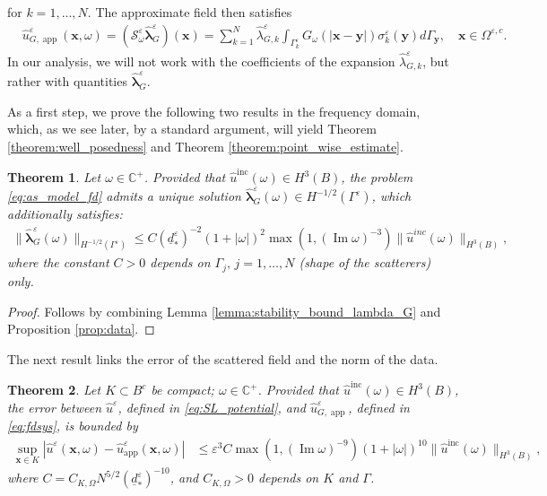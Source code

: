 \documentclass[]{article}
\newtheorem{theorem}{Theorem}
\numberwithin{equation}{section}
\numberwithin{theorem}{section}
\numberwithin{lemma}{section}
\numberwithin{corollary}{section}
\numberwithin{proposition}{section}
\numberwithin{definition}{section}
\newcommand{\bx}{\boldsymbol{x}}
\newcommand{\blambda}{\boldsymbol{\lambda}}
\newcommand{\re}{\varepsilon}
\renewcommand{\vec}{\boldsymbol}
\renewcommand{\Im}{\operatorname{Im}}
\newcommand{\inc}{\operatorname{inc}}
\begin{document}
	for $k = 1, \dots, N$. The approximate field then satisfies 
	\begin{align}
		\label{eq:fdsys}
		&\hat{u}^{\re}_{G,\operatorname{app}}(\boldsymbol{x},\omega) = (\mathcal{S}^{\re}_{\omega} \hat{{\blambda}}^{\re}_G)(\boldsymbol{x}) = \sum_{k=1}^{N} \hat{\lambda}^{\re}_{G,k} \int_{\Gamma^{\re}_k}  G_{\omega}(|\boldsymbol{x} - \boldsymbol{y}|) \sigma_k^{\re}(\vec{y}) d\Gamma_{\boldsymbol{y}} , \quad \boldsymbol{x} \in \Omega^{\re,c}.
	\end{align}
	In our analysis, we will not work with the coefficients of the expansion $\hat{\lambda}_{G,k}^{\re}$, but rather with quantities $\hat{\blambda}_G^{\re}$. 
	
	As a first step, we prove the following two results in the frequency domain, which, as we see later, by a standard argument, will yield Theorem \ref{theorem:well_posedness} and Theorem \ref{theorem:point_wise_estimate}. 
	\begin{theorem}
		\label{th:wp}
		Let $\omega\in \mathbb{C}^+$. Provided that $\hat{u}^{\inc}(\omega)\in H^3(B)$, the problem \eqref{eq:as_model_fd} admits a unique solution $\hat{\vec{\lambda}}_G^{\re}(\omega)\in H^{-1/2}(\Gamma^{\re})$, which additionally satisfies:
		\begin{align*}%
			\| \hat{\vec{\lambda}}^{\re}_G(\omega) \|_{H^{-1/2}(\Gamma^{\re})} \leq C (\underline{d}^{\re}_{*})^{-2} (1+  |\omega|)^2 \max(1, (\Im  \omega)^{-3}) \| \hat{{u}}^{inc}(\omega) \|_{H^3(B)}, 
		\end{align*}
		where the constant $C>0$ depends on $\Gamma_j, \, j=1,\ldots,N$ (shape of the scatterers) only. 
	\end{theorem}
	\begin{proof}
		Follows by combining Lemma \ref{lemma:stability_bound_lambda_G} and Proposition \ref{prop:data}.
	\end{proof}
	The next result links the error of the scattered field and the norm of the data.
	\begin{theorem}
		\label{th:conv}
		Let $K\subset B^c$ be compact; $\omega\in \mathbb{C}^+$. Provided that $\hat{u}^{\inc}(\omega)\in H^{3}(B)$, the error between $\hat{u}^{\re}$, defined in \eqref{eq:SL_potential}, and $\hat{u}^{\re}_{G,\operatorname{app}}$, defined in \eqref{eq:fdsys}, is bounded by
		\begin{align}
			\label{eq:bound_field_FD_v0}
			\sup_{\vec{x}\in K}|\hat{u}^{\re}(\bx,\omega) - \hat{u}^{\re}_{\operatorname{app}}(\bx,\omega)| &\leq\re^{3}  C \max(1, (\operatorname{Im}\omega)^{-9})(1 + |\omega|)^{10}  \|\hat{u}^{\inc}(\omega)\|_{H^3(B)},
		\end{align}
		where $C=C_{K,\Omega} N^{5/2} (\underline{d}^{\re}_*)^{-10}$, and $C_{K,\Omega}>0$ depends on $K$ and $\Gamma$.
	\end{theorem}
\end{document}
